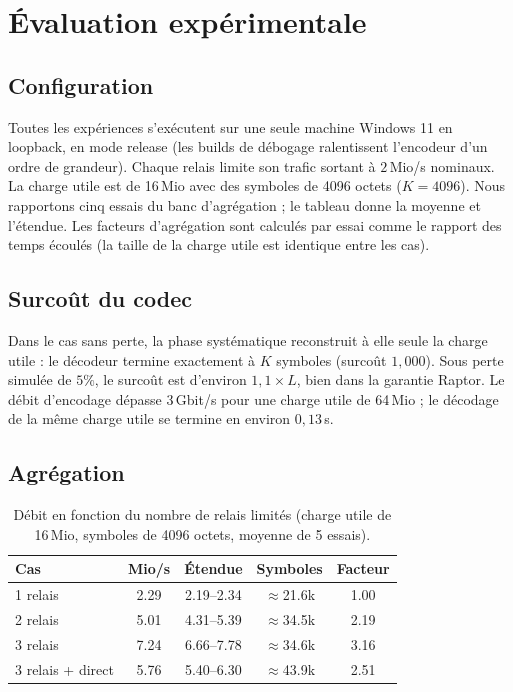 \documentclass[conference]{IEEEtran}
\begin{document}
\section{Évaluation expérimentale}
\label{sec:eval}

\subsection{Configuration}
Toutes les expériences s'exécutent sur une seule machine Windows 11 en
loopback, en mode release (les builds de débogage ralentissent l'encodeur d'un
ordre de grandeur). Chaque relais limite son trafic sortant à $2$\,Mio/s
nominaux. La charge utile est de 16\,Mio avec des symboles de 4096 octets
($K=4096$). Nous rapportons cinq essais du banc d'agrégation ; le tableau donne
la moyenne et l'étendue. Les facteurs d'agrégation sont calculés par essai
comme le rapport des temps écoulés (la taille de la charge utile est identique
entre les cas).

\subsection{Surcoût du codec}
Dans le cas sans perte, la phase systématique reconstruit à elle seule la
charge utile : le décodeur termine exactement à $K$ symboles (surcoût $1{,}000$).
Sous perte simulée de $5\%$, le surcoût est d'environ $1{,}1\times L$, bien dans
la garantie Raptor. Le débit d'encodage dépasse $3$\,Gbit/s pour une charge
utile de 64\,Mio ; le décodage de la même charge utile se termine en environ
$0{,}13$\,s.

\subsection{Agrégation}
\begin{table}[!t]
\centering
\caption{Débit en fonction du nombre de relais limités (charge utile de
16\,Mio, symboles de 4096 octets, moyenne de 5 essais).}
\label{tab:bench}
\begin{tabular}{@{}lcccc@{}}
\toprule
Cas & Mio/s & Étendue & Symboles & Facteur \\
\midrule
1 relais & 2.29 & 2.19--2.34 & $\approx$21.6k & 1.00 \\
2 relais & 5.01 & 4.31--5.39 & $\approx$34.5k & 2.19 \\
3 relais & 7.24 & 6.66--7.78 & $\approx$34.6k & 3.16 \\
3 relais + direct & 5.76 & 5.40--6.30 & $\approx$43.9k & 2.51 \\
\bottomrule
\end{tabular}
\end{table}
\end{document}
